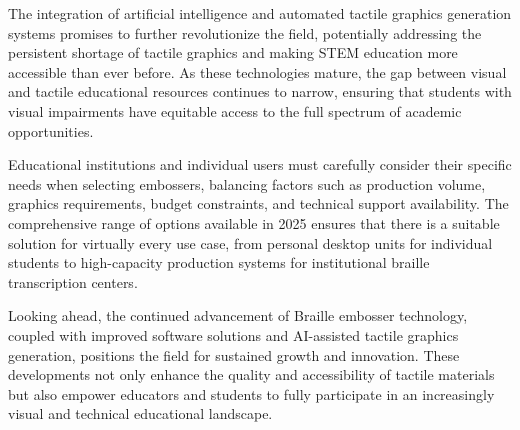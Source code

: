 The integration of artificial intelligence and automated tactile graphics generation systems promises to further revolutionize the field, potentially addressing the persistent shortage of tactile graphics and making STEM education more accessible than ever before. As these technologies mature, the gap between visual and tactile educational resources continues to narrow, ensuring that students with visual impairments have equitable access to the full spectrum of academic opportunities.

Educational institutions and individual users must carefully consider their specific needs when selecting embossers, balancing factors such as production volume, graphics requirements, budget constraints, and technical support availability. The comprehensive range of options available in 2025 ensures that there is a suitable solution for virtually every use case, from personal desktop units for individual students to high-capacity production systems for institutional braille transcription centers.

Looking ahead, the continued advancement of Braille embosser technology, coupled with improved software solutions and AI-assisted tactile graphics generation, positions the field for sustained growth and innovation. These developments not only enhance the quality and accessibility of tactile materials but also empower educators and students to fully participate in an increasingly visual and technical educational landscape.